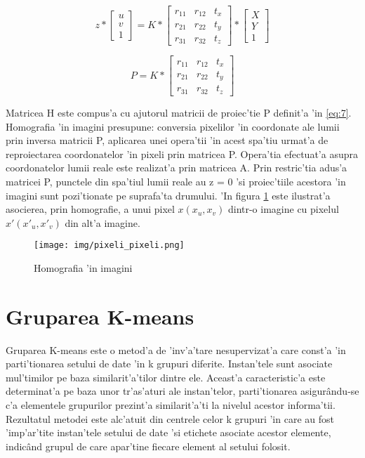 \documentclass[12pt,a4paper,twoside]{report}
\begin{document}
\begin{equation}
z * \begin{bmatrix}
	u \\
	v \\
	1
	\end{bmatrix}
= K * \begin{bmatrix}
	r_11 & r_12 & t_x \\
	r_21 & r_22 & t_y\\
	r_31 & r_32 & t_z
	\end{bmatrix} 
* \begin{bmatrix}
	X\\
	Y\\
	1
\end{bmatrix}
\label{eq:6}
\end{equation}

\begin{equation}
P
= K * \begin{bmatrix}
	r_11 & r_12 & t_x \\
	r_21 & r_22 & t_y\\
	r_31 & r_32 & t_z
	\end{bmatrix} 
\label{eq:7}
\end{equation}

\newpage
Matricea H este compus'a cu ajutorul matricii de proiec'tie P definit'a 'in \ref{eq:7}. Homografia 'in imagini presupune: conversia pixelilor 'in coordonate ale lumii prin inversa matricii P, aplicarea unei opera'tii 'in acest spa'tiu urmat'a de reproiectarea coordonatelor 'in pixeli prin matricea P. Opera'tia efectuat'a asupra coordonatelor lumii reale este realizat'a prin matricea A. Prin restric'tia adus'a matricei P, punctele din spa'tiul lumii reale au z = 0 'si proiec'tiile acestora 'in imagini sunt pozi'tionate pe suprafa'ta drumului. 'In figura \ref{fig:homografia} este ilustrat'a asocierea, prin homografie, a unui pixel $x(x_u,x_v)$ dintr-o imagine cu pixelul $x'(x'_u,x'_v)$ din alt'a imagine.

\begin{figure}[H]
  \texttt{[image: img/pixeli\_pixeli.png]}
  \centering
  \caption{Homografia 'in imagini}
  \label{fig:homografia}
\end{figure}

\section{Gruparea K-means}
\label{ch:k-means}
Gruparea K-means este o metod'a de 'inv'a'tare nesupervizat'a care const'a 'in parti'tionarea setului de date 'in k grupuri diferite. Instan'tele sunt asociate mul'timilor pe baza similarit'a'tilor dintre ele. Aceast'a caracteristic'a este determinat'a pe baza unor tr'as'aturi ale instan'telor, parti'tionarea asigur\^andu-se c'a elementele grupurilor prezint'a similarit'a'ti la nivelul acestor informa'tii. Rezultatul metodei este alc'atuit din centrele celor k grupuri 'in care au fost 'imp'ar'tite instan'tele setului de date 'si etichete asociate acestor elemente, indic\^and grupul de care apar'tine fiecare element al setului folosit.
\end{document}

